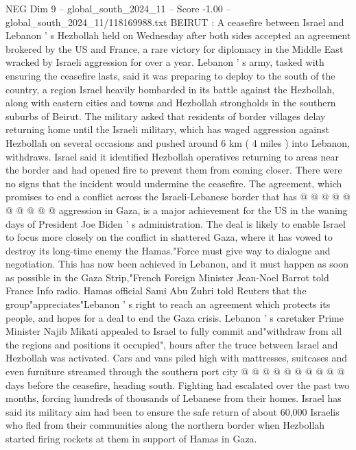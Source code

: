\begin{textsample}{NEG Dim 9 – global\_south\_2024\_11 – Score -1.00 – global\_south\_2024\_11/118169988.txt}  \label{ex:f9_neg_312}
BEIRUT : A ceasefire between Israel and Lebanon ' s Hezbollah held on Wednesday after both sides accepted an agreement brokered by the US and France, a rare victory for diplomacy in the Middle East wracked by Israeli aggression for over a year.
Lebanon ' s army, tasked with ensuring the ceasefire lasts, said it was preparing to deploy to the south of the country, a region Israel heavily bombarded in its battle against the Hezbollah, along with eastern cities and towns and Hezbollah strongholds in the southern suburbs of Beirut.
The military asked that residents of border villages delay returning home until the Israeli military, which has waged aggression against Hezbollah on several occasions and pushed around 6 km ( 4 miles ) into Lebanon, withdraws.
Israel said it identified Hezbollah operatives returning to areas near the border and had opened fire to prevent them from coming closer.
There were no signs that the incident would undermine the ceasefire.
The agreement, which promises to end a conflict across the Israeli-Lebanese border that has @ @ @ @ @ @ @ @ @ @ aggression in Gaza, is a major achievement for the US in the waning days of President Joe Biden ' s administration.
The deal is likely to enable Israel to focus more closely on the conflict in shattered Gaza, where it has vowed to destroy its long-time enemy the Hamas."Force must give way to dialogue and negotiation.
This has now been achieved in Lebanon, and it must happen as soon as possible in the Gaza Strip,"French Foreign Minister Jean-Noel Barrot told France Info radio.
Hamas official Sami Abu Zuhri told Reuters that the group"appreciates"Lebanon ' s right to reach an agreement which protects its people, and hopes for a deal to end the Gaza crisis.
Lebanon ' s caretaker Prime Minister Najib Mikati appealed to Israel to fully commit and"withdraw from all the regions and positions it occupied", hours after the truce between Israel and Hezbollah was activated.
Cars and vans piled high with mattresses, suitcases and even furniture streamed through the southern port city @ @ @ @ @ @ @ @ @ @ days before the ceasefire, heading south.
Fighting had escalated over the past two months, forcing hundreds of thousands of Lebanese from their homes.
Israel has said its military aim had been to ensure the safe return of about 60,000 Israelis who fled from their communities along the northern border when Hezbollah started firing rockets at them in support of Hamas in Gaza.

\end{textsample}

